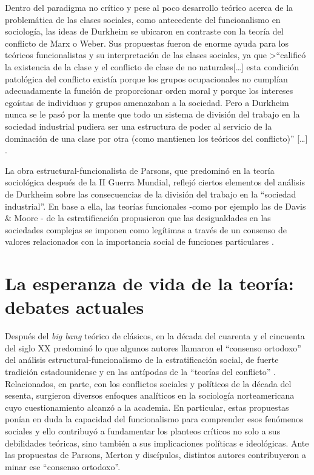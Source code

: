 \documentclass[
]{book}
\begin{document}
Dentro del paradigma no crítico y pese al poco desarrollo teórico acerca de la problemática de las clases sociales, como antecedente del funcionalismo en sociología, las ideas de Durkheim se ubicaron en contraste con la teoría del conflicto de Marx o Weber. Sus propuestas fueron de enorme ayuda para los teóricos funcionalistas y su interpretación de las clases sociales, ya que
\textgreater{}``calificó la existencia de la clase y el conflicto de clase de no naturales{[}\ldots{]} esta condición patológica del conflicto existía porque los grupos ocupacionales no cumplían adecuadamente la función de proporcionar orden moral y porque los intereses egoístas de individuos y grupos amenazaban a la sociedad. Pero a Durkheim nunca se le pasó por la mente que todo un sistema de división del trabajo en la sociedad industrial pudiera ser una estructura de poder al servicio de la dominación de una clase por otra (como mantienen los teóricos del conflicto)'' {[}\ldots{]} \citep[p.~106]{Kerbo2003}.

La obra estructural-funcionalista de Parsons, que predominó en la teoría sociológica después de la II Guerra Mundial, reflejó ciertos elementos del análisis de Durkheim sobre las consecuencias de la división del trabajo en la ``sociedad industrial''. En base a ella, las teorías funcionales -como por ejemplo las de Davis \& Moore \citep{Levine2006}- de la estratificación propusieron que las desigualdades en las sociedades complejas se imponen como legítimas a través de un consenso de valores relacionados con la importancia social de funciones particulares \citep[p.~13]{Crompton2008}.

\hypertarget{esperanza}{%
\section{La esperanza de vida de la teoría: debates actuales}\label{esperanza}}

Después del \emph{big bang} teórico de clásicos, en la década del cuarenta y el cincuenta del siglo XX predominó lo que algunos autores llamaron el ``consenso ortodoxo'' del análisis estructural-funcionalismo de la estratificación social, de fuerte tradición estadounidense y en las antípodas de la ``teorías del conflicto'' \citep[p.47]{Martinez2005}. Relacionados, en parte, con los conflictos sociales y políticos de la década del sesenta, surgieron diversos enfoques analíticos en la sociología norteamericana cuyo cuestionamiento alcanzó a la academia. En particular, estas propuestas ponían en duda la capacidad del funcionalismo para comprender esos fenómenos sociales y ello contribuyó a fundamentar los planteos críticos no solo a sus debilidades teóricas, sino también a sus implicaciones políticas e ideológicas. Ante las propuestas de Parsons, Merton y discípulos, distintos autores contribuyeron a minar ese ``consenso ortodoxo''.
\end{document}
